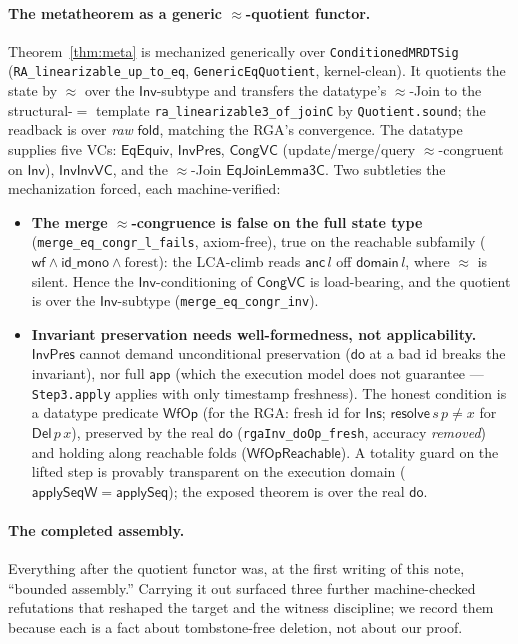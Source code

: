 \documentclass[11pt]{article}
\theoremstyle{definition}
\theoremstyle{remark}
\newcommand{\dodo}{\mathsf{do}}
\newcommand{\resolve}{\mathsf{resolve}}
\newcommand{\anc}{\mathsf{anc}}
\newcommand{\eqobs}{\approx}
\newcommand{\fold}{\mathsf{fold}}
\newcommand{\Inv}{\mathsf{Inv}}
\newcommand{\app}{\mathsf{app}}
\newcommand{\lean}[1]{\texttt{#1}}
\begin{document}
\paragraph{The metatheorem as a generic $\eqobs$-quotient functor.} Theorem~\ref{thm:meta} is
mechanized generically over \lean{ConditionedMRDTSig} (\lean{RA\_linearizable\_up\_to\_eq},
\lean{GenericEqQuotient}, kernel-clean). It quotients the state by $\eqobs$ over the $\Inv$-subtype
and transfers the datatype's $\eqobs$-Join to the structural-$=$ template
\lean{ra\_linearizable3\_of\_joinC} by \lean{Quotient.sound}; the readback is over \emph{raw}
$\fold$, matching the RGA's convergence. The datatype supplies five VCs: $\mathsf{EqEquiv}$,
$\mathsf{InvPres}$, $\mathsf{CongVC}$ (update/merge/query $\eqobs$-congruent on $\Inv$),
$\mathsf{InvInvVC}$, and the $\eqobs$-Join $\mathsf{EqJoinLemma3C}$. Two subtleties the
mechanization forced, each machine-verified:
\begin{itemize}[nosep]
  \item \textbf{The merge $\eqobs$-congruence is false on the full state type}
  (\lean{merge\_eq\_congr\_l\_fails}, axiom-free), true on the reachable subfamily
  ($\mathsf{wf}\wedge\mathsf{id\_mono}\wedge\text{forest}$): the LCA-climb reads $\anc\,l$ off
  $\mathsf{domain}\,l$, where $\eqobs$ is silent. Hence the $\Inv$-conditioning of $\mathsf{CongVC}$
  is load-bearing, and the quotient is over the $\Inv$-subtype (\lean{merge\_eq\_congr\_inv}).
  \item \textbf{Invariant preservation needs well-formedness, not applicability.} $\mathsf{InvPres}$
  cannot demand unconditional preservation ($\dodo$ at a bad id breaks the invariant), nor full
  $\app$ (which the execution model does not guarantee --- \lean{Step3.apply} applies with only
  timestamp freshness). The honest condition is a datatype predicate $\mathsf{WfOp}$ (for the RGA:
  fresh id for $\mathsf{Ins}$; $\resolve\,s\,p \neq x$ for $\mathsf{Del}\,p\,x$), preserved by the
  real $\dodo$ (\lean{rgaInv\_doOp\_fresh}, accuracy \emph{removed}) and holding along reachable
  folds ($\mathsf{WfOpReachable}$). A totality guard on the lifted step is provably transparent on
  the execution domain ($\mathsf{applySeqW}=\mathsf{applySeq}$); the exposed theorem is over the
  real $\dodo$.
\end{itemize}

\paragraph{The completed assembly.} Everything after the quotient functor was, at the
first writing of this note, ``bounded assembly.'' Carrying it out surfaced three further
machine-checked refutations that reshaped the target and the witness discipline; we record
them because each is a fact about tombstone-free deletion, not about our proof.
\end{document}
